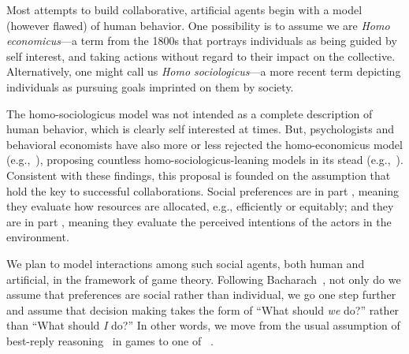 Most attempts to build collaborative, artificial agents begin with a
model (however flawed) of human behavior.
%
One possibility is to assume we are \emph{Homo economicus}---a term
from the 1800s that portrays individuals as being guided by self interest,
and taking actions without regard to their impact on the collective.
Alternatively, one might call us \emph{Homo
  sociologicus}---a more recent term depicting individuals as pursuing
goals imprinted on them by society.

The homo-sociologicus model was not intended as a complete description
of human behavior, which is clearly self interested at times.  But,
psychologists and behavioral economists have also more or less
rejected the homo-economicus model (e.g.,~\cite{kahnemanst82}),
proposing countless homo-sociologicus-leaning models in its
stead (e.g.,~\cite{falk2003nature,fehr1999theory,fehr2006economics,forsythe94,kahneman86}).
%
Consistent with these findings, this proposal is founded on the
assumption that 
 hold the key to successful collaborations.
%
Social preferences are in part , meaning they
evaluate how resources are allocated, e.g., efficiently or equitably;
and they are in part , meaning they evaluate the
perceived intentions of the actors in the environment.


We plan to model interactions among such social agents, both human and
artificial, in the framework of game theory.  
%
Following Bacharach~\cite{bacharach2006beyond}, not only do we assume
that preferences are social rather than individual, we go one step
further and assume that decision making takes the form of ``What
should \emph{we\/} do?'' rather than ``What should \emph{I\/} do?''
In other words, we move from the usual assumption of best-reply
reasoning~\cite{cournot} in games to one of ~\cite{TEAM REASONING: Bacharach 1999}.


